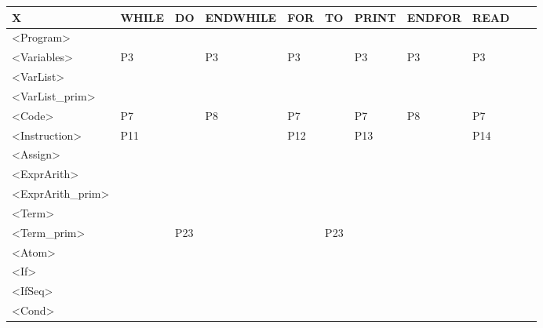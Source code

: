 \documentclass[12pt]{article}
\begin{document}
\begin{table}[H]
	\begin{tabular}{|l|l|l|l|l|l|l|l|l|l|l|}
		\hline
		X                                        & WHILE & DO  & ENDWHILE & FOR & TO  & PRINT & ENDFOR & READ \\ \hline
		\textless{}Program\textgreater{}         &       &     &          &     &     &       &        &      \\ \hline
		\textless{}Variables\textgreater{}       & P3    &     & P3       & P3  &     & P3    & P3     & P3   \\ \hline
		\textless{}VarList\textgreater{}         &       &     &          &     &     &       &        &      \\ \hline
		\textless{}VarList\_prim\textgreater{}   &       &     &          &     &     &       &        &      \\ \hline
		\textless{}Code\textgreater{}            & P7    &     & P8       & P7  &     & P7    & P8     & P7   \\ \hline
		\textless{}Instruction\textgreater{}     & P11   &     &          & P12 &     & P13   &        & P14  \\ \hline
		\textless{}Assign\textgreater{}          &       &     &          &     &     &       &        &      \\ \hline
		\textless{}ExprArith\textgreater{}       &       &     &          &     &     &       &        &      \\ \hline
		\textless{}ExprArith\_prim\textgreater{} &       &     &          &     &     &       &        &      \\ \hline
		\textless{}Term\textgreater{}            &       &     &          &     &     &       &        &      \\ \hline
		\textless{}Term\_prim\textgreater{}      &       & P23 &          &     & P23 &       &        &      \\ \hline
		\textless{}Atom\textgreater{}            &       &     &          &     &     &       &        &      \\ \hline
		\textless{}If\textgreater{}              &       &     &          &     &     &       &        &      \\ \hline
		\textless{}IfSeq\textgreater{}           &       &     &          &     &     &       &        &      \\ \hline
		\textless{}Cond\textgreater{}            &       &     &          &     &     &       &        &      \\ \hline

\end{tabular}
\end{table}
\end{document}
